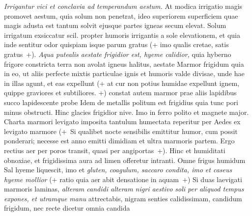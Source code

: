 \textit{Irrigantur vici et conclavia ad temperandum aestum.} At modica irrigatio\protect{} magis promovet aestum, quia solum non penetrat, ideo superiorem superficiem quae magis adusta est tantum solvit ejusque partes igneas\protect{} secum elevat. Solum irrigatum exsiccatur scil. propter humoris irrigantis a sole elevationem, et quia inde sentitur odor\protect{} quispiam isque parum gratus (+ imo qualis cretae, satis gratus~+). \textit{Aqua putealis aestate frigidior est, hyeme calidior,} quia hyberno frigore constricta terra\protect{} non avolat igneus halitus, aestate  Marmor frigidum quia in eo, ut aliis perfecte mixtis particulae ignis\protect{} et humoris\protect{} valde divisae, unde hae in illas agunt, et eas expellunt (+ at cur non potius humidae expellunt ignem, quippe graviores et subtiliores. +) constat autem marmor prae aliis lapidibus succo lapidescente\protect{} probe  Idem de metallis\protect{} politum est frigidius quia tunc pori minus obstructi. Hinc glacies frigidior nive. Imo in ferro\protect{} polito et magnete   major. Charta marmori levigato imposita tantulum humectata reperitur per  Aedes\protect{} ex levigato marmore 
(+~Si qualibet nocte sensibilis emittitur humor,
cum possit ponderari; necesse est anno emitti dimidiam et ultra marmoris partem.
Ergo rectius aer per poros transit, quasi per angiportas~+). Hinc et humiditati obnoxiae\protect{}, et frigidissima aura\protect{} ad limen\protect{} offeretur intranti. Omne frigus humidum  Sal hyeme liquescit, imo et \textit{gluten, coagulum, saccaro condita, imo et caseus hyeme mollior} (+ ratio quia aer abit densatione\protect{} in aquam~+)  Si duas laevigati marmoris laminas, \textit{alteram candidi alteram nigri aestivo soli per aliquod tempus expones, et utramque manu} attrectabis, nigram senties calidissimam, candidum frigidum, nec recte dicetur omnia candida 

